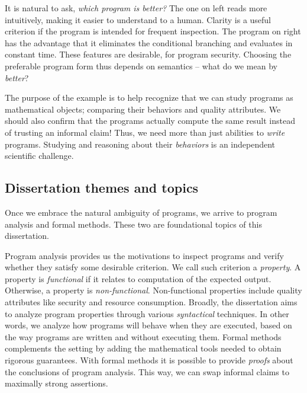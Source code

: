 It is natural to ask, \emph{which program is better?}
The one on left reads more intuitively, making it easier to understand to a human.
Clarity is a useful criterion if the program is intended for frequent inspection.
The program on right has the advantage that it eliminates the conditional branching and evaluates in {constant time}.
These features are desirable, \eg for program security.
Choosing the preferable program form thus depends on semantics -- what do we mean by \emph{better}?

The purpose of the example is to help recognize that we can study programs as mathematical objects;
comparing their behaviors and quality attributes.
We should also confirm that the programs {actually} compute the same result instead of trusting an informal claim!
Thus, we need more than just abilities to \emph{write} programs.
Studying and reasoning about their \emph{behaviors} is an independent scientific challenge.

\subsection{Dissertation themes and topics}
\label{subsec:dissertation-themes}

Once we embrace the natural ambiguity of programs, we arrive to program analysis and formal methods.
These two are foundational topics of this dissertation.

Program analysis provides us the motivations to inspect programs and verify whether they satisfy some desirable criterion.
We call such criterion a \emph{property}.
A property is \emph{functional} if it relates to computation of the expected output.
Otherwise, a property is \emph{non-functional}.
Non-functional properties include quality attributes like security and resource consumption.
Broadly, the dissertation aims to analyze program properties through various \emph{syntactical} techniques.
In other words, we analyze how programs will behave when they are executed, based on the way programs are written and without executing them.
Formal methods complements the setting by adding the mathematical tools needed to obtain rigorous guarantees.
With formal methods it is possible to provide \emph{proofs} about the conclusions of program analysis.
This way, we can swap informal claims to maximally strong assertions.

